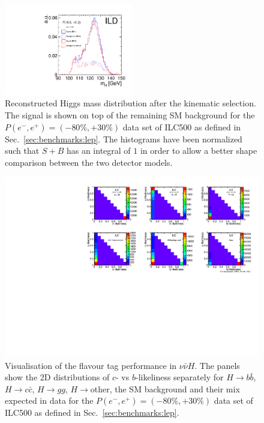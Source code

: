 \begin{figure}[htbp]
\begin{center}
 \includegraphics[width=0.5\textwidth]{Performance/fig/IDRplot5.pdf}
\end{center}
\caption{Reconstructed Higgs mass distribution after the kinematic selection. The signal is shown on top of the remaining SM background for the $P(e^-,e^+)=(-80\%,+30\%)$ data set of ILC500 as defined in Sec.~\ref{sec:benchmarks:lep}. The histograms have been normalized such that $S+B$ has an integral of $1$ in order to allow a better shape comparison between the two detector models.
}
\label{fig:Hbbccgg:mh}
\end{figure}


\begin{figure}[htbp]
\begin{center}
 \includegraphics[width=\textwidth]{Performance/fig/IDRplot4.pdf}
\end{center}
\caption{Visualisation of the flavour tag performance in $\nu\bar{\nu} H$. The panels show the 2D distributions of $c$- vs $b$-likeliness separately for $H \to b\bar{b}$, $H \to c\bar{c}$, $H \to gg$, $H \to$other, the SM background and their mix expected in data for the $P(e^-,e^+)=(-80\%,+30\%)$ data set of ILC500 as defined in Sec.~\ref{sec:benchmarks:lep}.
}
\label{fig:Hbbccgg:likeli}
\end{figure}

